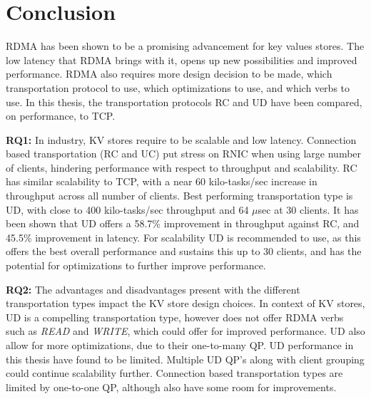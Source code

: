 
\chapter{Conclusion}\label{ch:conclusion} %



\ifpdf
    \graphicspath{{7/figures/PNG/}{7/figures/PDF/}{7/figures/}}
\else
    \graphicspath{{7/figures/EPS/}{7/figures/}}
\fi


%
RDMA has been shown to be a promising advancement for key values stores.
The low latency that RDMA brings with it, opens up new possibilities and improved performance.
RDMA also requires more design decision to be made, which transportation protocol to use, which optimizations to use, and which verbs to use.
In this thesis, the transportation protocols RC and UD have been compared, on performance, to TCP.

\textbf{RQ1:} In industry, KV stores require to be scalable and low latency.
Connection based transportation (RC and UC) put stress on RNIC when using large number of clients, hindering performance with respect to throughput and scalability.
RC has similar scalability to TCP, with a near 60 kilo-tasks/sec increase in throughput across all number of clients.
Best performing transportation type is UD, with close to 400 kilo-tasks/sec throughput and 64 $\mu$sec at 30 clients.
It has been shown that UD offers a 58.7\% improvement in throughput against RC, and 45.5\% improvement in latency.
For scalability UD is recommended to use, as this offers the best overall performance and sustains this up to 30 clients, and has the potential for optimizations to further improve performance.

\textbf{RQ2:} The advantages and disadvantages present with the different transportation types impact the KV store design choices.
In context of KV stores, UD is a compelling transportation type, however does not offer RDMA verbs such as \textit{READ} and \textit{WRITE}, which could offer for improved performance.
UD also allow for more optimizations, due to their one-to-many QP.
UD performance in this thesis have found to be limited.
Multiple UD QP's along with client grouping could continue scalability further.
Connection based transportation types are limited by one-to-one QP, although also have some room for improvements.


